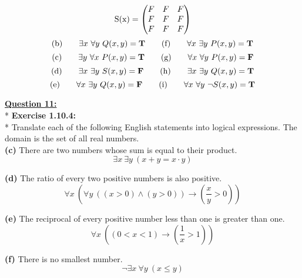\documentclass[12pt, letterpaper, twoside]{article}
\begin{document}
\[
  \begin{array}{l@{{}={}}c}
  \text{S(x)} & \left(\begin{array}{@{}ccc@{}}
    F & F & F \\
    F & F & F \\
    F & F & F \\
  \end{array}\right)
  \end{array}
\]
\[\text{(b)} \qquad \exists x\ \forall y\ Q(x, y)  = \text{\textbf{T}} \qquad \text{(f)} \qquad \forall x\ \exists y\ P(x, y)  = \text{\textbf{T}}\]
\[\text{(c)} \qquad \exists y\ \forall x\ P(x, y)  = \text{\textbf{T}} \qquad \text{(g)} \qquad \forall x\ \forall y\ P(x, y) = \text{\textbf{F}}\]
\[\text{(d)} \qquad \exists x\ \exists y\ S(x, y)  = \text{\textbf{F}} \qquad \text{(h)} \qquad \exists x\ \exists y\ Q(x, y) = \text{\textbf{T}}\]
\[\text{(e)} \qquad \forall x\ \exists y\ Q(x, y)  = \text{\textbf{F}} \qquad \text{(i)} \qquad \forall x\ \forall y\ \neg{S}(x, y)  = \text{\textbf{T}}\]

\newpage
\noindent \underline{\textbf{Question 11:}}\\*
\break
\textbf{Exercise 1.10.4:}\\*
Translate each of the following English statements into logical expressions. The domain is the set of all real numbers.\\
\break
\textbf{(c)} There are two numbers whose sum is equal to their product.\\ 
\break
\[ \exists x\ \exists y\ (x+y=x \cdot y) \]
\break

\noindent \textbf{(d)} The ratio of every two positive numbers is also positive.\\ 
\break
\[ \forall x\ (\forall y\ ((x>0) \land (y>0)) \to (\frac{x}{y}>0)) \]
\break

\noindent \textbf{(e)} The reciprocal of every positive number less than one is greater than one.\\ 
\break
\[ \forall x\ ((0 < x < 1) \to (\frac{1}{x} > 1)) \]
\break

\noindent \textbf{(f)} There is no smallest number.\\  
\break
\[ \neg{\exists} x\ \forall y\ (x \leq y) \]
\break
\end{document}
